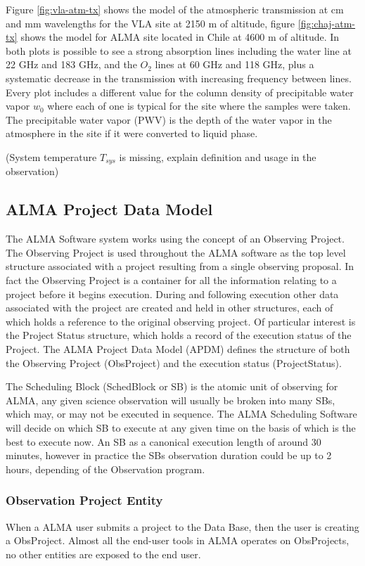 \documentclass[11pt]{article}
\begin{document}
Figure \ref{fig:vla-atm-tx} shows the model of the atmospheric transmission at cm and mm wavelengths for the VLA site at 2150 m of altitude, figure \ref{fig:chaj-atm-tx} shows the model for ALMA site located in Chile at 4600 m of altitude. In both plots is possible to see a strong absorption lines including the water line at 22 GHz and 183 GHz, and the $O_2$ lines at 60 GHz and 118 GHz, plus a systematic decrease in the transmission with increasing frequency between lines. Every plot includes a different value for the column density of precipitable water vapor $w_0$ where each of one is typical for the site where the samples were taken. The precipitable water vapor (PWV) is the depth of the water vapor in the atmosphere in the site if it were converted to liquid phase.

(System temperature $T_{sys}$ is missing, explain definition and usage in the observation)

\subsection{ALMA Project Data Model}
\label{sec:apdm}
The ALMA Software system works using the concept of an Observing Project. The Observing Project is used throughout the ALMA software as the top level structure associated with a project resulting from a single observing proposal. In fact the Observing Project is a container for all the information relating to a project before it begins execution. During and following execution other data associated with the project are created and held in other structures, each of which holds a reference to the original observing project. Of particular interest is the Project Status structure, which holds a record of the execution status of the Project. The ALMA Project Data Model (APDM) defines the structure of both the Observing Project (ObsProject) and the execution status (ProjectStatus).

The Scheduling Block (SchedBlock or SB) is the atomic unit of observing for ALMA, any given science observation will usually be broken into many SBs, which may, or may not be executed in sequence. The ALMA Scheduling Software will decide on which SB to execute at any given time on the basis of which is the best to execute now. An SB as a canonical execution length of around 30 minutes, however in practice the SBs observation duration could be up to 2 hours, depending of the Observation program.

\subsubsection*{Observation Project Entity}
When a ALMA user submits a project to the Data Base, then the user is creating a ObsProject. Almost all the end-user tools in ALMA operates on ObsProjects, no other entities are exposed to the end user.
\end{document}
